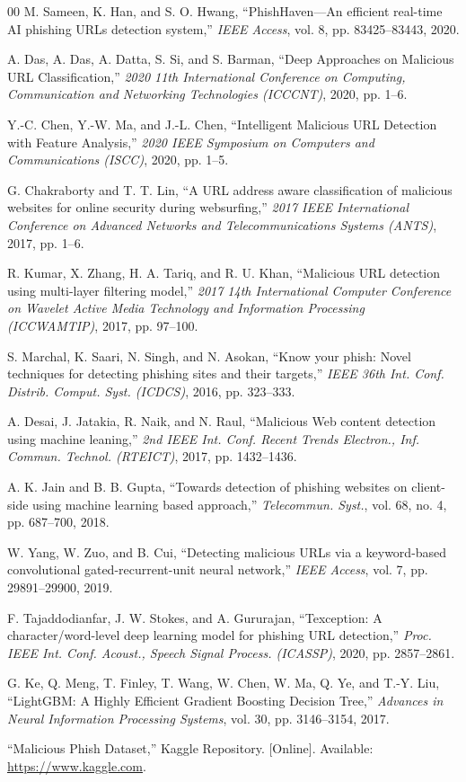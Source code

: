 \documentclass[conference]{IEEEtran}
\begin{document}
\begin{thebibliography}{00}
M. Sameen, K. Han, and S. O. Hwang, ``PhishHaven—An efficient real-time AI phishing URLs detection system,'' \emph{IEEE Access}, vol. 8, pp. 83425--83443, 2020.

A. Das, A. Das, A. Datta, S. Si, and S. Barman, ``Deep Approaches on Malicious URL Classification,'' \emph{2020 11th International Conference on Computing, Communication and Networking Technologies (ICCCNT)}, 2020, pp. 1--6.

Y.-C. Chen, Y.-W. Ma, and J.-L. Chen, ``Intelligent Malicious URL Detection with Feature Analysis,'' \emph{2020 IEEE Symposium on Computers and Communications (ISCC)}, 2020, pp. 1--5.

G. Chakraborty and T. T. Lin, ``A URL address aware classification of malicious websites for online security during websurfing,'' \emph{2017 IEEE International Conference on Advanced Networks and Telecommunications Systems (ANTS)}, 2017, pp. 1--6.

R. Kumar, X. Zhang, H. A. Tariq, and R. U. Khan, ``Malicious URL detection using multi-layer filtering model,'' \emph{2017 14th International Computer Conference on Wavelet Active Media Technology and Information Processing (ICCWAMTIP)}, 2017, pp. 97--100.

S. Marchal, K. Saari, N. Singh, and N. Asokan, ``Know your phish: Novel techniques for detecting phishing sites and their targets,'' \emph{IEEE 36th Int. Conf. Distrib. Comput. Syst. (ICDCS)}, 2016, pp. 323--333.

A. Desai, J. Jatakia, R. Naik, and N. Raul, ``Malicious Web content detection using machine leaning,'' \emph{2nd IEEE Int. Conf. Recent Trends Electron., Inf. Commun. Technol. (RTEICT)}, 2017, pp. 1432--1436.

A. K. Jain and B. B. Gupta, ``Towards detection of phishing websites on client-side using machine learning based approach,'' \emph{Telecommun. Syst.}, vol. 68, no. 4, pp. 687--700, 2018.

W. Yang, W. Zuo, and B. Cui, ``Detecting malicious URLs via a keyword-based convolutional gated-recurrent-unit neural network,'' \emph{IEEE Access}, vol. 7, pp. 29891--29900, 2019.

F. Tajaddodianfar, J. W. Stokes, and A. Gururajan, ``Texception: A character/word-level deep learning model for phishing URL detection,'' \emph{Proc. IEEE Int. Conf. Acoust., Speech Signal Process. (ICASSP)}, 2020, pp. 2857--2861.

G. Ke, Q. Meng, T. Finley, T. Wang, W. Chen, W. Ma, Q. Ye, and T.-Y. Liu, ``LightGBM: A Highly Efficient Gradient Boosting Decision Tree,'' \emph{Advances in Neural Information Processing Systems}, vol. 30, pp. 3146--3154, 2017.

``Malicious Phish Dataset,'' Kaggle Repository. [Online]. Available: \url{https://www.kaggle.com}.

\end{thebibliography}
\end{document}
